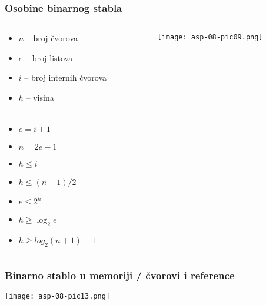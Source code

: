 \documentclass[compress]{beamer}
\begin{document}
\begin{frame}[fragile]
  \frametitle{Osobine binarnog stabla}
\begin{columns}
  \begin{column}[c]{6cm}
  \begin{itemize}
    \item $n$ -- broj čvorova
    \item $e$ -- broj listova
    \item $i$ -- broj internih čvorova
    \item $h$ -- visina \\ \ \\
    \item $e = i+1$
    \item $n = 2e-1$
    \item $h\leq i$
    \item $h\leq (n-1)/2$
    \item $e\leq 2^h$
    \item $h\geq \log_2 e$
    \item $h\geq log_2(n+1)-1$
  \end{itemize}
  \end{column}
  \begin{column}[c]{5cm}
  \begin{center}
    \texttt{[image: asp-08-pic09.png]}
  \end{center}
  \end{column}
\end{columns}
\end{frame}

\begin{frame}[fragile]
  \frametitle{Binarno stablo u memoriji / čvorovi i reference}
\begin{center}
  \texttt{[image: asp-08-pic13.png]}
\end{center}
\end{frame}
\end{document}
